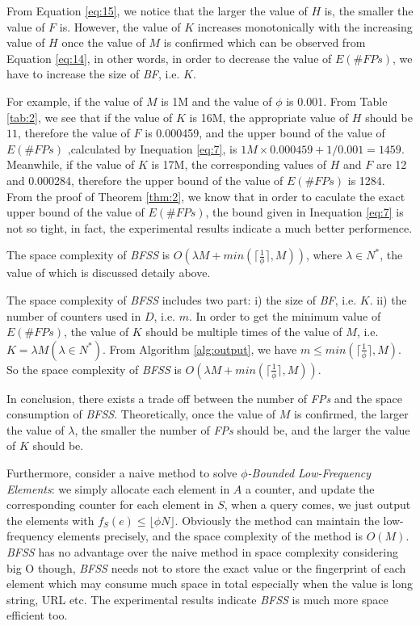 \documentclass[conference]{IEEEtran}
\begin{document}
From Equation \ref{eq:15}, we notice that the larger the value of $H$ is, the smaller the value of $F$ is. However, the value of $K$ increases monotonically with the increasing value of $H$ once the value of $M$ is confirmed which can be observed from Equation \ref{eq:14}, in other words, in order to decrease the value of $E(\#FPs)$, we have to increase the size of \emph{BF}, i.e. $K$.\par 

For example, if the value of $M$ is 1M and the value of $\phi$ is 0.001. From Table \ref{tab:2}, we see that if the value of $K$ is 16M, the appropriate value of $H$ should be $11$, therefore the value of $F$ is 0.000459, and the upper bound of the value of $E(\#FPs)$ ,calculated by Inequation \ref{eq:7}, is $1M\times0.000459+1/0.001=1459$. Meanwhile, if the value of $K$ is 17M, the corresponding values of $H$ and $F$ are 12 and 0.000284, therefore the upper bound of the value of $E(\#FPs)$ is 1284. From the proof of Theorem \ref{thm:2}, we know that in order to caculate the exact upper bound of the value of $E(\#FPs)$, the bound given in Inequation \ref{eq:7} is not so tight, in fact, the experimental results indicate a much better performence.\par

\begin{theorem}\label{thm:4}
The space complexity of \emph{BFSS} is $O(\lambda M+ min(\lceil\frac{1}{\phi}\rceil,M))$, where $\lambda\in N^*$, the value of which is discussed detaily above. 
\end{theorem}

\begin{IEEEproof}
The space complexity of \emph{BFSS} includes two part: i) the size of \emph{BF}, i.e. $K$. ii) the number of counters used in $D$, i.e. $m$. In order to get the minimum value of $E(\#FPs)$, the value of $K$ should be multiple times of the value of $M$, i.e. $K=\lambda M(\lambda\in N^*)$. From Algorithm \ref{alg:output}, we have $m\leq min(\lceil\frac{1}{\phi}\rceil,M)$. So the space complexity of \emph{BFSS} is $O(\lambda M+ min(\lceil\frac{1}{\phi}\rceil,M))$.
\end{IEEEproof}

In conclusion, there exists a trade off between the number of \emph{FPs} and the space consumption of \emph{BFSS}. Theoretically, once the value of $M$ is confirmed, the larger the value of $\lambda$, the smaller the number of \emph{FPs} should be, and the larger the value of $K$ should be.\par
Furthermore, consider a naive method to solve $\phi$\emph{-Bounded Low-Frequency Elements}: we simply allocate each element in $A$ a counter, and update the corresponding counter for each element in $S$, when a query comes, we just output the elements with $f_S(e)\leq\lfloor \phi N\rfloor$. Obviously the method can maintain the low-frequency elements precisely, and the space complexity of the method is $O(M)$. \emph{BFSS} has no advantage over the naive method in space complexity considering big O though, \emph{BFSS} needs not to store the exact value or the fingerprint of each element which may consume much space in total especially when the value is long string, URL etc. The experimental results indicate \emph{BFSS} is much more space efficient too.
\end{document}
